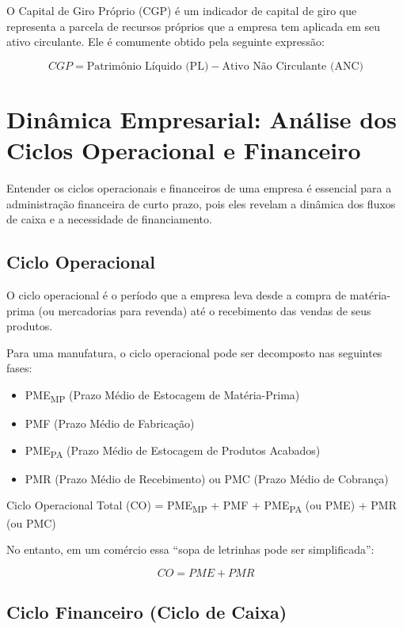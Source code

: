 \documentclass[
  a4paper,
]{book}
\providecommand{\tightlist}{%
  \setlength{\itemsep}{0pt}\setlength{\parskip}{0pt}}\usepackage{longtable,booktabs,array}
\begin{document}
O Capital de Giro Próprio (CGP) é um indicador de capital de giro que
representa a parcela de recursos próprios que a empresa tem aplicada em
seu ativo circulante. Ele é comumente obtido pela seguinte expressão:

\[CGP = \text{Patrimônio Líquido (PL)} - \text{Ativo Não Circulante (ANC)}\]

\section{Dinâmica Empresarial: Análise dos Ciclos Operacional e
Financeiro}\label{dinuxe2mica-empresarial-anuxe1lise-dos-ciclos-operacional-e-financeiro}

Entender os ciclos operacionais e financeiros de uma empresa é essencial
para a administração financeira de curto prazo, pois eles revelam a
dinâmica dos fluxos de caixa e a necessidade de financiamento.

\subsection{Ciclo Operacional}\label{ciclo-operacional}

O ciclo operacional é o período que a empresa leva desde a compra de
matéria-prima (ou mercadorias para revenda) até o recebimento das vendas
de seus produtos.

Para uma manufatura, o ciclo operacional pode ser decomposto nas
seguintes fases:

\begin{itemize}
\tightlist
\item
  PME\textsubscript{MP} (Prazo Médio de Estocagem de Matéria-Prima)
\item
  PMF (Prazo Médio de Fabricação)
\item
  PME\textsubscript{PA} (Prazo Médio de Estocagem de Produtos Acabados)
\item
  PMR (Prazo Médio de Recebimento) ou PMC (Prazo Médio de Cobrança)
\end{itemize}

Ciclo Operacional Total (CO) = PME\textsubscript{MP} + PMF +
PME\textsubscript{PA} (ou PME) + PMR (ou PMC)

No entanto, em um comércio essa ``sopa de letrinhas pode ser
simplificada'':

\[CO = PME + PMR\]

\subsection{Ciclo Financeiro (Ciclo de
Caixa)}\label{ciclo-financeiro-ciclo-de-caixa}
\end{document}
